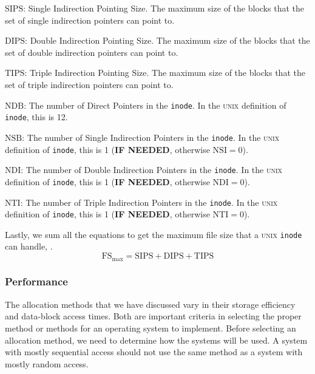 \begin{description}[noitemsep]
\item $\mathrm{SIPS}$: Single Indirection Pointing Size.
  The maximum size of the blocks that the set of single indirection pointers can point to.
\item $\mathrm{DIPS}$: Double Indirection Pointing Size.
  The maximum size of the blocks that the set of double indirection pointers can point to.
\item $\mathrm{TIPS}$: Triple Indirection Pointing Size.
  The maximum size of the blocks that the set of triple indirection pointers can point to.
\item $\mathrm{NDB}$: The number of Direct Pointers in the \texttt{inode}.
  In the \textsc{unix} definition of \texttt{inode}, this is 12.
\item $\mathrm{NSB}$: The number of Single Indirection Pointers in the \texttt{inode}.
  In the \textsc{unix} definition of \texttt{inode}, this is 1 (\textbf{IF NEEDED}, otherwise $\mathrm{NSI} = 0$).
\item $\mathrm{NDI}$: The number of Double Indirection Pointers in the \texttt{inode}.
  In the \textsc{unix} definition of \texttt{inode}, this is 1 (\textbf{IF NEEDED}, otherwise $\mathrm{NDI} = 0$).
\item $\mathrm{NTI}$: The number of Triple Indirection Pointers in the \texttt{inode}.
  In the \textsc{unix} definition of \texttt{inode}, this is 1 (\textbf{IF NEEDED}, otherwise $\mathrm{NTI} = 0$).
\end{description}

Lastly, we sum all the equations  to get the maximum file size that a \textsc{unix} \texttt{inode} can handle, .
\begin{equation}\label{eq:Inode_Max_File_Size}
  \mathrm{FS}_{\max} = \mathrm{SIPS} + \mathrm{DIPS} + \mathrm{TIPS}
\end{equation}

\subsubsection{Performance}\label{subsubsec:File_Allocation_Performance}
The allocation methods that we have discussed vary in their storage efficiency
and data-block access times. Both are important criteria in selecting the proper
method or methods for an operating system to implement.
Before selecting an allocation method, we need to determine how the
systems will be used. A system with mostly sequential access should not use
the same method as a system with mostly random access.


